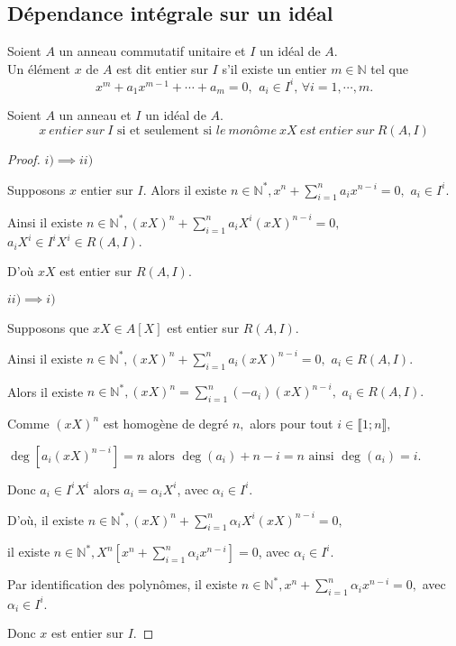 \subsection{Dépendance intégrale sur un idéal}
\begin{madefinition}
	Soient $A$ un anneau commutatif unitaire et $I$ un idéal de $A$.\\ Un élément $x$ de $A$ est dit entier sur $I$ s'il existe un entier $m \in \mathbb{N}$ tel que  
	\[ 	x^m + a_1 x^{m-1} + \cdots + a_m = 0\text{, } \ a_i \in I^i,\, \forall i=1, \cdots ,m. \]	
\end{madefinition}
\begin{maproposition}
	Soient $A$ un anneau et $I$ un idéal de $A$.
	\[ x \ entier \ sur \ I \text{ si et seulement si } le \ monôme \ xX  \ est \ entier \ sur \ R(A, I) \]
\end{maproposition}
\begin{proof}
	$i) \implies ii)$
	
	Supposons $x$ entier sur $I.$ Alors il existe $n\in \mathbb{N}^{\ast },x^{n}+\sum\limits_{i=1}^{n}a_{i}x^{n-i}=0,$ $a_{i}\in I^{i}.$
	
	Ainsi il existe $n\in \mathbb{N}^{\ast },(xX)^{n}+\sum\limits_{i=1}^{n}a_{i}X^{i}(xX)^{n-i}=0,$ $
	a_{i}X^{i}\in I^{i}X^{i}\in R(A,I).$
	
	D’où $xX$ est entier sur $R(A,I).$
	
	$ii)\implies i)$
	
	Supposons que  $xX\in A[X]$ est entier sur $R(A,I).$
	
	Ainsi il existe $n\in \mathbb{N}^{\ast },(xX)^{n}+\sum\limits_{i=1}^{n}a_{i}(xX)^{n-i}=0,$ $a_{i}\in R(A,I).
	$
	
	Alors il existe $n\in \mathbb{N}^{\ast },(xX)^{n}=\sum\limits_{i=1}^{n}(-a_{i})(xX)^{n-i},$ $a_{i}\in
	R(A,I).$
	
	Comme $(xX)^{n}$ est homogène de degré $n,$ alors pour tout $i\in \llbracket 1; n \rrbracket,$
	
	$\deg [a_{i}(xX)^{n-i}]=n\text{ alors } \deg (a_{i})+n-i=n\text{ ainsi } \deg
	(a_{i})=i.$
	
	Donc $a_{i}\in I^{i}X^{i}\text{ alors } a_{i}=\alpha _{i}X^{i}$, avec $\alpha
	_{i}\in I^{i}.$
	
	D’où, il existe $n\in \mathbb{N}^{\ast },(xX)^{n}+\sum\limits_{i=1}^{n}\alpha _{i}X^{i}(xX)^{n-i}=0,$
	
	il existe $n\in \mathbb{N}^{\ast },X^{n}[x^{n}+\sum\limits_{i=1}^{n}\alpha _{i}x^{n-i}]=0$, avec $\alpha _{i}\in I^{i}.$
	
	Par identification des polynômes, il existe $n\in \mathbb{N}^{\ast },x^{n}+\sum\limits_{i=1}^{n}\alpha _{i}x^{n-i}=0,$ avec $\alpha_{i}\in I^{i}.$
	
	Donc $x$ est entier sur $I.$
\end{proof}
